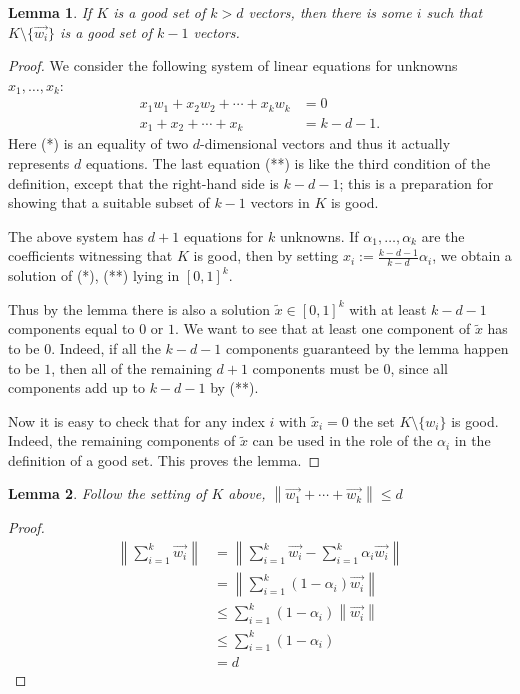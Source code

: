\documentclass{article}
\newtheorem{lemma}{Lemma}[section]
\newcommand{\norm}[1]{\left\lVert #1 \right\rVert}
\begin{document}
\begin{lemma}
    If $K$ is a good set of $k>d$ vectors, then there is some $i$ such that $K\setminus\{\vec{w_i}\}$ is a good set of $k-1$ vectors.
\end{lemma}
\begin{proof}
We consider the following system of linear equations for unknowns \(x_1, \ldots, x_k\):
\begin{align}
    x_1 w_1 + x_2 w_2 + \cdots + x_k w_k &= 0 \tag{*} \\
    x_1 + x_2 + \cdots + x_k &= k - d - 1. \tag{**}
\end{align}
Here (*) is an equality of two \(d\)-dimensional vectors and thus it actually represents \(d\) equations. The last equation (**) is like the third condition of the definition, except that the right-hand side is \(k - d - 1\); this is a preparation for showing that a suitable subset of \(k - 1\) vectors in \(K\) is good.

The above system has \(d + 1\) equations for \(k\) unknowns. If \(\alpha_1, \ldots, \alpha_k\) are the coefficients witnessing that \(K\) is good, then by setting \(x_i := \frac{k - d - 1}{k - d} \alpha_i\), we obtain a solution of (*), (**) lying in \([0, 1]^k\).

Thus by the lemma there is also a solution \(\tilde{x} \in [0, 1]^k\) with at least \(k - d - 1\) components equal to \(0\) or \(1\). We want to see that at least one component of \(\tilde{x}\) has to be \(0\). Indeed, if all the \(k - d - 1\) components guaranteed by the lemma happen to be \(1\), then all of the remaining \(d + 1\) components must be \(0\), since all components add up to \(k - d - 1\) by (**).

Now it is easy to check that for any index \(i\) with \(\tilde{x}_i = 0\) the set \(K \setminus \{w_i\}\) is good. Indeed, the remaining components of \(\tilde{x}\) can be used in the role of the \(\alpha_i\) in the definition of a good set. This proves the lemma.
\end{proof}

\begin{lemma}
    Follow the setting of $K$ above, $\norm{\vec{w_1}+\cdots+\vec{w_k}}\leq d$
\end{lemma}
\begin{proof}
    \begin{align*}
        \norm{\sum_{i=1}^k\vec{w_i}} &= \norm{\sum_{i=1}^k\vec{w_i}-\sum_{i=1}^k\alpha_i\vec{w_i}}\\
        &= \norm{\sum_{i=1}^k(1-\alpha_i)\vec{w_i}}\\
        &\leq \sum_{i=1}^k(1-\alpha_i)\norm{\vec{w_i}}\\
        &\leq \sum_{i=1}^k(1-\alpha_i)\\
        &= d
    \end{align*}
\end{proof}
\end{document}
